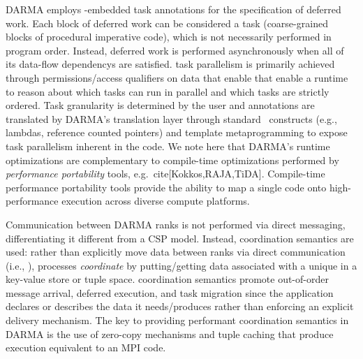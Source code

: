 \gls{DARMA} employs \CC-embedded task annotations for the specification of \gls{deferred
work}. Each block of \gls{deferred work} can be considered a task (coarse-grained blocks of 
\gls{procedural} \gls{imperative} code),  which is not necessarily performed in program order.   Instead,
\gls{deferred work} is performed asynchronously when all of its \glspl{data-flow dependency} are
satisfied.  \Gls{task parallelism} is primarily achieved through permissions/access qualifiers
on data that enable that enable a runtime to reason about which tasks can run in parallel and which tasks are strictly ordered.
Task granularity is determined by the user and annotations are translated by \gls{DARMA}'s \gls{translation
layer} through standard \CC\ constructs (e.g., \glspl{lambda}, \glspl{reference counted pointer}) and \gls{template metaprogramming} to
expose \gls{task parallelism} inherent in the code.
We note here that \gls{DARMA}'s runtime optimizations are complementary to
compile-time optimizations performed by \emph{performance
portability} tools, e.g.~cite[Kokkos,RAJA,TiDA].  Compile-time performance
portability tools provide the ability to map a
single code onto high-performance execution across diverse compute platforms.


Communication between \gls{DARMA} ranks is not performed via direct messaging,
differentiating it different from a \gls{CSP} model.  Instead, \gls{coordination
semantics} are used:   
rather than explicitly move data between ranks via direct communication
(i.e.,  ), processes \emph{coordinate} by putting/getting data associated with a unique  in a
\gls{key-value store} or \gls{tuple space}.  
\Gls{coordination semantics} promote out-of-order message arrival, deferred execution, and task migration
since the application declares or describes the data it needs/produces rather than enforcing an explicit delivery mechanism.
The key to providing performant coordination semantics in \gls{DARMA} is 
the use of \gls{zero-copy} mechanisms and tuple caching that 
produce execution equivalent to an MPI  code. 



